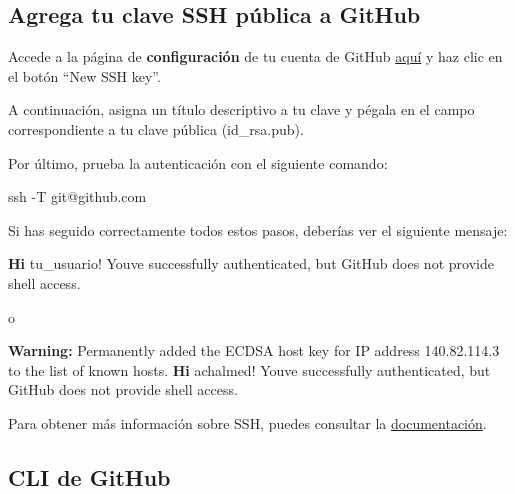 \documentclass[
  a4paper,
]{article}
\newenvironment{Shaded}{}{}
\newcommand{\AttributeTok}[1]{\textcolor[rgb]{0.84,0.23,0.29}{#1}}
\newcommand{\ExtensionTok}[1]{\textcolor[rgb]{0.84,0.23,0.29}{\textbf{#1}}}
\newcommand{\FunctionTok}[1]{\textcolor[rgb]{0.44,0.26,0.76}{#1}}
\newcommand{\NormalTok}[1]{\textcolor[rgb]{0.14,0.16,0.18}{#1}}
\newcommand{\StringTok}[1]{\textcolor[rgb]{0.01,0.18,0.38}{#1}}
\begin{document}
\subsection{Agrega tu clave SSH pública a
GitHub}\label{agrega-tu-clave-ssh-puxfablica-a-github}

Accede a la página de \textbf{configuración} de tu cuenta de GitHub
\href{https://github.com/settings/keys}{aquí} y haz clic en el botón
``New SSH key''.

A continuación, asigna un título descriptivo a tu clave y pégala en el
campo correspondiente a tu clave pública (id\_rsa.pub).

Por último, prueba la autenticación con el siguiente comando:

\begin{Shaded}
\begin{Highlighting}[]
\FunctionTok{ssh} \AttributeTok{{-}T}\NormalTok{ git@github.com}
\end{Highlighting}
\end{Shaded}

Si has seguido correctamente todos estos pasos, deberías ver el
siguiente mensaje:

\begin{Shaded}
\begin{Highlighting}[]
\ExtensionTok{Hi}\NormalTok{ tu\_usuario! You}\StringTok{\textquotesingle{}ve successfully authenticated, but GitHub does not provide shell access.}
\end{Highlighting}
\end{Shaded}

o

\begin{Shaded}
\begin{Highlighting}[]
\ExtensionTok{Warning:}\NormalTok{ Permanently added the ECDSA host key for IP address }\StringTok{\textquotesingle{}140.82.114.3\textquotesingle{}}\NormalTok{ to the list of known hosts.}
\ExtensionTok{Hi}\NormalTok{ achalmed! You}\StringTok{\textquotesingle{}ve successfully authenticated, but GitHub does not provide shell access.}
\end{Highlighting}
\end{Shaded}

Para obtener más información sobre SSH, puedes consultar la
\href{https://cli.github.com/}{documentación}.

\subsection{CLI de GitHub}\label{cli-de-github}
\end{document}
